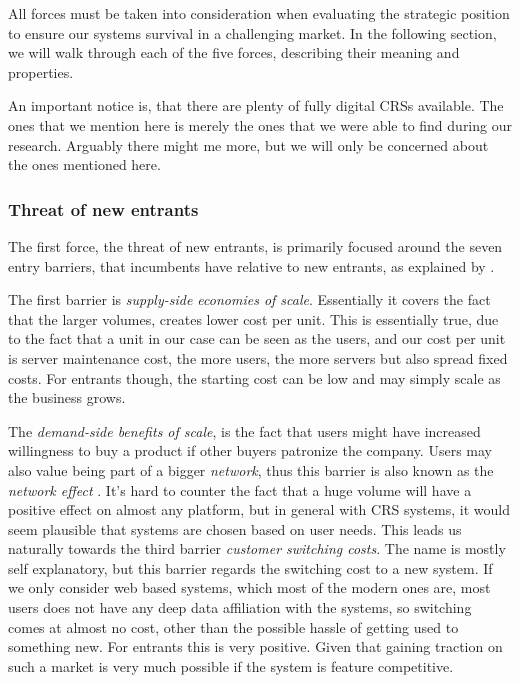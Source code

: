 All forces must be taken into consideration when evaluating the strategic position to ensure our systems survival in a challenging market.
In the following section, we will walk through each of the five forces, describing their meaning and properties.

An important notice is, that there are plenty of fully digital CRSs available. The ones that we mention here is merely the ones that we were able to find during our research. Arguably there might me more, but we will only be concerned about the ones mentioned here. 

\subsubsection*{Threat of new entrants}\label{sec:threat-of-new-entrants}
The first force, the threat of new entrants, is primarily focused around the seven entry barriers, that incumbents have relative to new entrants, as explained by .

The first barrier is \emph{supply-side economies of scale}. Essentially it covers the fact that the larger volumes, creates lower cost per unit. This is essentially true, due to the fact that a unit in our case can be seen as the users, and our cost per unit is server maintenance cost, the more users, the more servers but also spread fixed costs. For entrants though, the starting cost can be low and may simply scale as the business grows.

The \emph{demand-side benefits of scale}, is the fact that users might have increased willingness to buy a product if other buyers patronize the company. Users may also value being part of a bigger \emph{network}, thus this barrier is also known as the \emph{network effect} \cite[p.~81]{porter2008five}. It's hard to counter the fact that a huge volume will have a positive effect on almost any platform, but in general with CRS systems, it would seem plausible that systems are chosen based on user needs. This leads us naturally towards the third barrier \emph{customer switching costs}. The name is mostly self explanatory, but this barrier regards the switching cost to a new system. If we only consider web based systems, which most of the modern ones are, most users does not have any deep data affiliation with the systems, so switching comes at almost no cost, other than the possible hassle of getting used to something new. For entrants this is very positive. Given that gaining traction on such a market is very much possible if the system is feature competitive.

